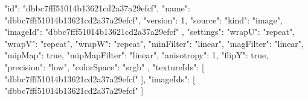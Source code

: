 {
  "id": "dbbc7fff51014b13621cd2a37a29efcf",
  "name": "dbbc7fff51014b13621cd2a37a29efcf",
  "version": 1,
  "source": {
    "kind": "image",
    "imageId": "dbbc7fff51014b13621cd2a37a29efcf"
  },
  "settings": {
    "wrapU": "repeat",
    "wrapV": "repeat",
    "wrapW": "repeat",
    "minFilter": "linear",
    "magFilter": "linear",
    "mipMap": true,
    "mipMapFilter": "linear",
    "anisotropy": 1,
    "flipY": true,
    "precision": "low",
    "colorSpace": "srgb"
  },
  "textureIds": [
    "dbbc7fff51014b13621cd2a37a29efcf"
  ],
  "imageIds": [
    "dbbc7fff51014b13621cd2a37a29efcf"
  ]
}
